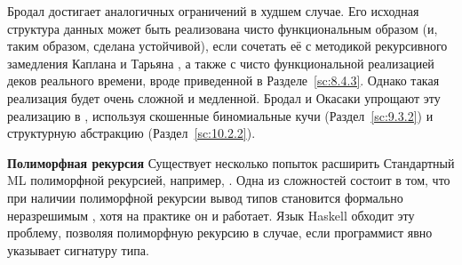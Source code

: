 Бродал \cite{Brodal1995, Brodal1996} достигает аналогичных ограничений
в худшем случае. Его исходная структура данных \cite{Brodal1995} может
быть реализована чисто функциональным образом (и, таким образом,
сделана устойчивой), если сочетать её с методикой рекурсивного
замедления Каплана и Тарьяна \cite{KaplanTarjan1995}, а также с чисто
функциональной реализацией деков реального времени, вроде приведенной
в Разделе~\ref{sc:8.4.3}. Однако такая реализация будет
очень сложной и медленной. Бродал и Окасаки упрощают эту реализацию в
\cite{BrodalOkasaki1996}, используя скошенные биномиальные кучи
(Раздел~\ref{sc:9.3.2}) и структурную абстракцию (Раздел~\ref{sc:10.2.2}).

\noindent
\textbf{Полиморфная рекурсия} Существует несколько попыток расширить
Стандартный ML полиморфной рекурсией, например, \cite{Myers1984,
  Henglein1993, KfouryTiurynUrzyczyn1993}. Одна из сложностей
состоит в том, что при наличии полиморфной рекурсии вывод типов
становится формально неразрешимым \cite{Henglein1993, KfouryTiurynUrzyczyn1993},
хотя на практике он и работает. Язык Haskell обходит эту проблему,
позволяя полиморфную рекурсию в случае, если программист явно
указывает сигнатуру типа.

